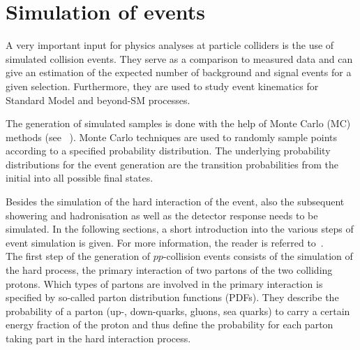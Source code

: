 \FloatBarrier
\chapter{Simulation of events}
\label{ch:SimulationOfEvents}

A very important input for physics analyses at particle colliders is the use of simulated collision events.
They serve as a comparison to measured data and can give an estimation of the expected number of background and signal events for a given selection.
Furthermore, they are used to study event kinematics for Standard Model and beyond-SM processes.

The generation of simulated samples is done with the help of Monte Carlo (MC) methods (see \eg~\cite{bib:MC_Introduction}).
Monte Carlo techniques are used to randomly sample points according to a specified probability distribution.
The underlying probability distributions for the event generation are the transition probabilities from the initial into all possible final states.

Besides the simulation of the hard interaction of the event, also the subsequent showering and hadronisation as well as the detector response needs to be simulated.
In the following sections, a short introduction into the various steps of event simulation is given.
For more information, the reader is referred to~\cite{bib:Matthias_Thesis}.\\

The first step of the generation of $pp$-collision events consists of the simulation of the hard process, \ie the primary interaction of two partons of the two colliding protons.
Which types of partons are involved in the primary interaction is specified by so-called parton distribution functions (PDFs).
They describe the probability of a parton (up-, down-quarks, gluons, sea quarks) to carry a certain energy fraction of the proton and thus define the probability for each parton taking part in the hard interaction process.

